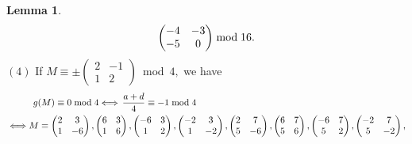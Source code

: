 \documentclass[12pt]{article}
\theoremstyle{definition}
\newtheorem{lemma}[theorem]{Lemma}
\numberwithin{equation}{section}
\numberwithin{theorem}{section}
\begin{document}
\begin{lemma}
{\begin{align}
\begin{pmatrix}
-4 & -3 \\
-5 & 0
\end{pmatrix}
 \bmod{16}. \notag  %
\end{align}
$\mathrm{(4)}$ If 
$
M
\equiv
\pm
\begin{pmatrix}
2 & -1 \\
1 & 2
\end{pmatrix}
\bmod{4}, 
$ 
we have  
\begin{align*}
&\hspace{10mm} g(M)\equiv 0 \bmod{4} 
\Longleftrightarrow \,
\frac{a+d}{4}\equiv -1 \bmod{4} \notag \\
&\Longleftrightarrow
M
\equiv 
\begin{pmatrix}
2 & 3 \\
1 & -6
\end{pmatrix}, 
\begin{pmatrix}
6 & 3 \\
1 & 6
\end{pmatrix}, 
\begin{pmatrix}
-6 & 3 \\
1 & 2
\end{pmatrix}, 
\begin{pmatrix}
-2 & 3 \\
1 & -2
\end{pmatrix}, 
\begin{pmatrix}
2 & 7 \\
5 & -6
\end{pmatrix}, 
\begin{pmatrix}
6 & 7 \\
5 & 6
\end{pmatrix}, 
\begin{pmatrix}
-6 & 7 \\
5 & 2
\end{pmatrix}, 
\begin{pmatrix}
-2 & 7 \\
5 & -2
\end{pmatrix},   \\

\end{align*}}
\end{lemma}
\end{document}
